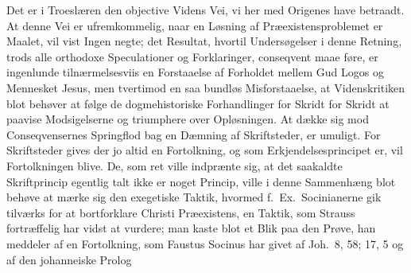 \documentclass[12pt]{book}
\begin{document}
Det er i Troeslæren den objective Videns Vei, vi her med Origenes
have betraadt. At denne Vei er ufremkommelig, naar en Løsning af
Præexistensproblemet er Maalet, vil vist Ingen negte; det Resultat,
hvortil Undersøgelser i denne Retning, trods alle orthodoxe
Speculationer og Forklaringer, conseqvent maae føre, er ingenlunde
tilnærmelsesviis en Forstaaelse af Forholdet mellem Gud Logos og
Mennesket Jesus, men tvertimod en saa
bundløs Misforstaaelse, at Videnskritiken blot behøver at følge de
dogmehistoriske Forhandlinger for Skridt for Skridt at paavise
Modsigelserne og triumphere over Opløsningen. At dække sig mod
Conseqvensernes Springflod bag en Dæmning af Skriftsteder, er
umuligt. For Skriftsteder gives der jo altid en Fortolkning, og som
Erkjendelsesprincipet er, vil Fortolkningen blive. De, som ret ville
indprænte sig, at det saakaldte Skriftprincip egentlig talt ikke er
noget Princip, ville i denne Sammenhæng blot behøve at mærke sig den
exegetiske Taktik, hvormed f.\ Ex.\ Socinianerne gik tilværks for at
bortforklare Christi Præexistens, en Taktik, som Strauss fortræffelig
har vidst at vurdere; man kaste blot et Blik paa den Prøve, han
meddeler af en Fortolkning, som Faustus Socinus har givet af
Joh.\ 8, 58; 17, 5 og af den johanneiske Prolog%
\end{document}
